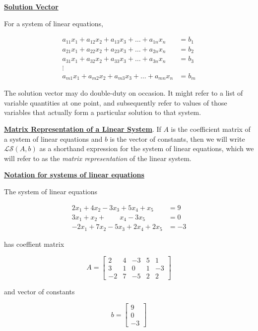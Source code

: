 \documentclass[openany]{book}
\begin{document}
\protect\hyperlink{definition-solv-solution-vector}{\textbf{Solution
Vector}}

For a system of linear equations,

\[\begin{aligned}
a_{11}x_1+a_{12}x_2+a_{13}x_3+\dots+a_{1n}x_n&=b_1\\
a_{21}x_1+a_{22}x_2+a_{23}x_3+\dots+a_{2n}x_n&=b_2\\
a_{31}x_1+a_{32}x_2+a_{33}x_3+\dots+a_{3n}x_n&=b_3\\
\vdots&\\
a_{m1}x_1+a_{m2}x_2+a_{m3}x_3+\dots+a_{mn}x_n&=b_m
\end{aligned}\]

The solution vector may do double-duty on occasion. It might refer to a
list of variable quantities at one point, and subsequently refer to
values of those variables that actually form a particular solution to
that system.

\protect\hyperlink{definition-mrls-matrix-representation-of-a-linear-system}{\textbf{Matrix
Representation of a Linear System}}. If \(A\) is the coefficient matrix
of a system of linear equations and \({b}\) is the vector of constants,
then we will write \(\mathcal L \mathcal S({A}, b)\) as a shorthand
expression for the system of linear equations, which we will refer to as
the \emph{matrix representation} of the linear system.

\protect\hyperlink{example-nsle-notation-for-systems-of-linear-equations}{\textbf{Notation
for systems of linear equations}}

The system of linear equations

\[\begin{aligned}
2x_1+4x_2-3x_3+5x_4+x_5&=9\\
3x_1+x_2+\quad\quad x_4-3x_5&=0\\
-2x_1+7x_2-5x_3+2x_4+2x_5&=-3
\end{aligned}\]

has coeffient matrix

\[
A=
\begin{bmatrix}
2 & 4 & -3 & 5 & 1\\
3 & 1 & 0 & 1 & -3\\
-2 & 7 & -5 & 2 & 2
\end{bmatrix}
\]

and vector of constants

\[
{b}=\begin{bmatrix}
9\\
0\\
-3
\end{bmatrix}
\]
\end{document}
